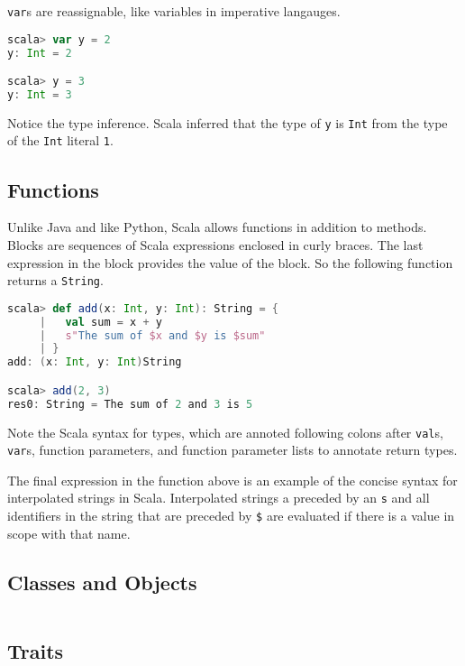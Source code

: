 {\tt var}s are reassignable, like variables in imperative langauges.

\begin{lstlisting}[language=Scala]
scala> var y = 2
y: Int = 2

scala> y = 3
y: Int = 3
\end{lstlisting}

Notice the type inference. Scala inferred that the type of {\tt y} is {\tt Int} from the type of the {\tt Int} literal {\tt 1}.


\subsection{Functions}

Unlike Java and like Python, Scala allows functions in addition to methods. Blocks are sequences of Scala expressions enclosed in curly braces. The last expression in the block provides the value of the block. So the following function returns a {\tt String}.

\begin{lstlisting}[language=Scala]
scala> def add(x: Int, y: Int): String = {
     |   val sum = x + y
     |   s"The sum of $x and $y is $sum"
     | }
add: (x: Int, y: Int)String

scala> add(2, 3)
res0: String = The sum of 2 and 3 is 5
\end{lstlisting}

Note the Scala syntax for types, which are annoted following colons after {\tt val}s, {\tt var}s, function parameters, and function parameter lists to annotate return types.

The final expression in the function above is an example of the concise syntax for interpolated strings in Scala. Interpolated strings a preceded by an {\tt s} and all identifiers in the string that are preceded by {\tt \$} are evaluated if there is a value in scope with that name.

\subsection{Classes and Objects}

\begin{lstlisting}[language=Scala]
\end{lstlisting}

\subsection{Traits}

